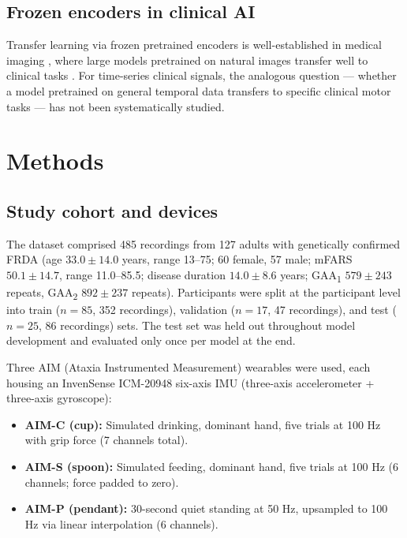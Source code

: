 \documentclass[10pt,twocolumn]{IEEEtran}
\begin{document}
\subsection{Frozen encoders in clinical AI}
Transfer learning via frozen pretrained encoders is well-established
in medical imaging \cite{Esteva2017Dermatologist,Rajpurkar2022},
where large models pretrained on natural images transfer well to
clinical tasks \cite{Hannun2019Cardiologist}.
For time-series clinical signals, the analogous question --- whether
a model pretrained on general temporal data transfers to specific
clinical motor tasks --- has not been systematically studied.

\section{Methods}

\subsection{Study cohort and devices}

The dataset comprised 485 recordings from 127 adults with genetically
confirmed FRDA
(age $33.0 \pm 14.0$ years, range 13--75; 60 female, 57 male;
mFARS $50.1 \pm 14.7$, range 11.0--85.5;
disease duration $14.0 \pm 8.6$ years;
GAA\textsubscript{1} $579 \pm 243$ repeats,
GAA\textsubscript{2} $892 \pm 237$ repeats).
Participants were split at the participant level into
train ($n=85$, 352 recordings),
validation ($n=17$, 47 recordings), and
test ($n=25$, 86 recordings) sets.
The test set was held out throughout model development and evaluated
only once per model at the end.

Three AIM (Ataxia Instrumented Measurement) wearables were used,
each housing an InvenSense ICM-20948 six-axis IMU
(three-axis accelerometer + three-axis gyroscope):
\begin{itemize}
  \item \textbf{AIM-C (cup):} Simulated drinking, dominant hand,
    five trials at 100 Hz with grip force (7 channels total).
  \item \textbf{AIM-S (spoon):} Simulated feeding, dominant hand,
    five trials at 100 Hz (6 channels; force padded to zero).
  \item \textbf{AIM-P (pendant):} 30-second quiet standing at 50 Hz,
    upsampled to 100 Hz via linear interpolation (6 channels).
\end{itemize}
\end{document}
